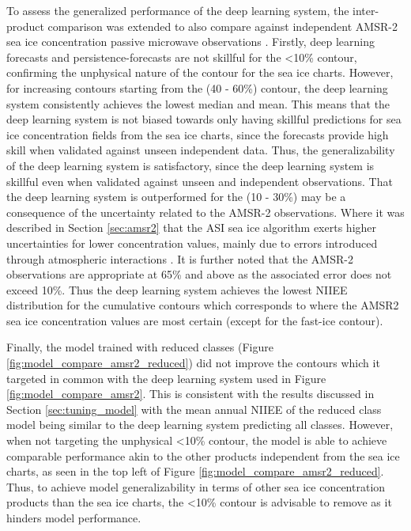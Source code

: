 \documentclass[../main/thesis]{subfiles}
\begin{document}
To assess the generalized performance of the deep learning system, the inter-product comparison was extended to also compare against independent AMSR-2 sea ice concentration passive microwave observations \citep{Spreen2008}. Firstly, deep learning forecasts and persistence-forecasts are not skillful for the <10\% contour, confirming the unphysical nature of the contour for the sea ice charts. However, for increasing contours starting from the (40 - 60\%) contour, the deep learning system consistently achieves the lowest median and mean. This means that the deep learning system is not biased towards only having skillful predictions for sea ice concentration fields from the sea ice charts,  since the forecasts provide high skill when validated against unseen independent data. Thus, the generalizability of the deep learning system is satisfactory, since the deep learning system is skillful even when validated against unseen and independent observations. That the deep learning system is outperformed for the (10 - 30\%) may be a consequence of the uncertainty related to the AMSR-2 observations. Where it was described in Section \ref{sec:amsr2} that the ASI sea ice algorithm exerts higher uncertainties for lower concentration values, mainly due to errors introduced through atmospheric interactions \citep{Spreen2008}. It is further noted that the AMSR-2 observations are appropriate at 65\% and above as the associated error does not exceed 10\%. Thus the deep learning system achieves the lowest NIIEE distribution for the cumulative contours which corresponds to where the AMSR2 sea ice concentration values are most certain (except for the fast-ice contour).

Finally, the model trained with reduced classes (Figure \ref{fig:model_compare_amsr2_reduced}) did not improve the contours which it targeted in common with the deep learning system used in Figure \ref{fig:model_compare_amsr2}. This is consistent with the results discussed in Section \ref{sec:tuning_model} with the mean annual NIIEE of the reduced class model being similar to the deep learning system predicting all classes. However, when not targeting the unphysical <10\% contour, the model is able to achieve comparable performance akin to the other products independent from the sea ice charts, as seen in the top left of Figure \ref{fig:model_compare_amsr2_reduced}. Thus, to achieve model generalizability in terms of other sea ice concentration products than the sea ice charts, the <10\% contour is advisable to remove as it hinders model performance.
\end{document}
